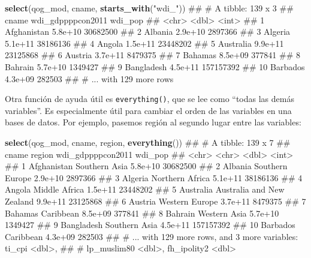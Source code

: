 \documentclass[]{book}
\newenvironment{Shaded}{\begin{snugshade}}{\end{snugshade}}
\newcommand{\KeywordTok}[1]{\textcolor[rgb]{0.13,0.29,0.53}{\textbf{#1}}}
\newcommand{\StringTok}[1]{\textcolor[rgb]{0.31,0.60,0.02}{#1}}
\newcommand{\NormalTok}[1]{#1}
\begin{document}
\begin{Shaded}
\begin{Highlighting}[]
\KeywordTok{select}\NormalTok{(qog_mod, cname, }\KeywordTok{starts_with}\NormalTok{(}\StringTok{"wdi_"}\NormalTok{))}
\NormalTok{## # A tibble: 139 x 3}
\NormalTok{##          cname wdi_gdppppcon2011   wdi_pop}
\NormalTok{##          <chr>             <dbl>     <int>}
\NormalTok{##  1 Afghanistan           5.8e+10  30682500}
\NormalTok{##  2     Albania           2.9e+10   2897366}
\NormalTok{##  3     Algeria           5.1e+11  38186136}
\NormalTok{##  4      Angola           1.5e+11  23448202}
\NormalTok{##  5   Australia           9.9e+11  23125868}
\NormalTok{##  6     Austria           3.7e+11   8479375}
\NormalTok{##  7     Bahamas           8.5e+09    377841}
\NormalTok{##  8     Bahrain           5.7e+10   1349427}
\NormalTok{##  9  Bangladesh           4.5e+11 157157392}
\NormalTok{## 10    Barbados           4.3e+09    282503}
\NormalTok{## # ... with 129 more rows}
\end{Highlighting}
\end{Shaded}

Otra función de ayuda útil es \texttt{everything()}, que se lee como
``todas las demás variables''. Es especialmente útil para cambiar el
orden de las variables en una bases de datos. Por ejemplo, pasemos
región al segundo lugar entre las variables:

\begin{Shaded}
\begin{Highlighting}[]
\KeywordTok{select}\NormalTok{(qog_mod, cname, region, }\KeywordTok{everything}\NormalTok{())}
\NormalTok{## # A tibble: 139 x 7}
\NormalTok{##          cname                    region wdi_gdppppcon2011   wdi_pop}
\NormalTok{##          <chr>                     <chr>             <dbl>     <int>}
\NormalTok{##  1 Afghanistan             Southern Asia           5.8e+10  30682500}
\NormalTok{##  2     Albania           Southern Europe           2.9e+10   2897366}
\NormalTok{##  3     Algeria           Northern Africa           5.1e+11  38186136}
\NormalTok{##  4      Angola             Middle Africa           1.5e+11  23448202}
\NormalTok{##  5   Australia Australia and New Zealand           9.9e+11  23125868}
\NormalTok{##  6     Austria            Western Europe           3.7e+11   8479375}
\NormalTok{##  7     Bahamas                 Caribbean           8.5e+09    377841}
\NormalTok{##  8     Bahrain              Western Asia           5.7e+10   1349427}
\NormalTok{##  9  Bangladesh             Southern Asia           4.5e+11 157157392}
\NormalTok{## 10    Barbados                 Caribbean           4.3e+09    282503}
\NormalTok{## # ... with 129 more rows, and 3 more variables: ti_cpi <dbl>,}
\NormalTok{## #   lp_muslim80 <dbl>, fh_ipolity2 <dbl>}
\end{Highlighting}
\end{Shaded}
\end{document}
